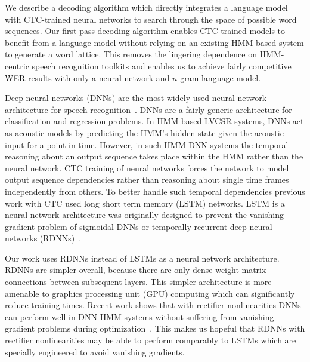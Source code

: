 We describe a decoding algorithm which directly integrates a language model
with CTC-trained neural networks to search through the space of possible word
sequences. Our first-pass decoding algorithm enables CTC-trained models to
benefit from a language model without relying on an existing HMM-based system
to generate a word lattice. This removes the lingering dependence on
HMM-centric speech recognition toolkits and enables us to achieve fairly
competitive WER results with only a neural network and $n$-gram language model.

Deep neural networks (DNNs) are the most widely used neural network
architecture for speech recognition~\cite{hinton2012}. DNNs are a fairly
generic architecture for classification and regression problems. In HMM-based
LVCSR systems, DNNs act as acoustic models by predicting the HMM's hidden state
given the acoustic input for a point in time. However, in such HMM-DNN systems
the temporal reasoning about an output sequence takes place within the HMM
rather than the neural network. CTC training of neural networks forces the
network to model output sequence dependencies rather than reasoning about
single time frames independently from others. To better handle such temporal
dependencies previous work with CTC used long short term memory (LSTM)
networks. LSTM is a neural network architecture was originally designed to
prevent the vanishing gradient problem of sigmoidal DNNs or temporally
recurrent deep neural networks (RDNNs)~\cite{hochreiter1997}.

Our work uses RDNNs instead of LSTMs as a neural network architecture. RDNNs
are simpler overall, because there are only dense weight matrix connections
between subsequent layers. This simpler architecture is more amenable to
graphics processing unit (GPU) computing which can significantly reduce
training times. Recent work shows that with rectifier nonlinearities DNNs can
perform well in DNN-HMM systems without suffering from vanishing gradient
problems during optimization~\cite{dahl2013, zeiler2013, maas2013}. This makes
us hopeful that RDNNs with rectifier nonlinearities may be able to perform
comparably to LSTMs which are specially engineered to avoid vanishing
gradients.
